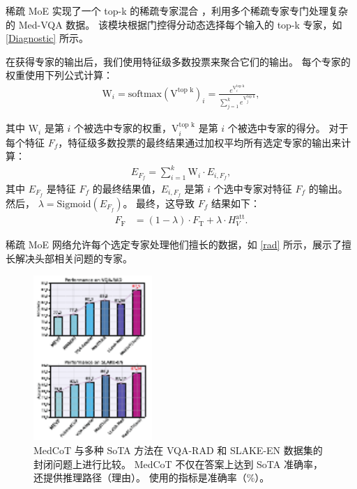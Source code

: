 \documentclass[11pt]{article}
\begin{document}
稀疏 MoE 实现了一个 top-k 的稀疏专家混合 \cite{fedus2022switch}，利用多个稀疏专家专门处理复杂的 Med-VQA 数据。
该模块根据门控得分动态选择每个输入的 top-k 专家，如 \autoref{Diagnostic} 所示。

在获得专家的输出后，我们使用特征级多数投票来聚合它们的输出。
每个专家的权重使用下列公式计算：
\begin{align}
    \text{W}_i = \text{softmax}(\text{V}^{\text{top k}})_i = \frac{e^{\text{V}^{\text{top k}}_i}}{\sum_{j=1}^{k} e^{\text{V}^{\text{top k}}_j}},
\end{align}

其中 \(\text{W}_i\) 是第 \(i\) 个被选中专家的权重，\(\text{V}^{\text{top k}}_i\) 是第 \(i\) 个被选中专家的得分。
对于每个特征 \( F_f \)，特征级多数投票的最终结果通过加权平均所有选定专家的输出来计算：
\begin{align}
    {E}_{F_f} = \sum_{i=1}^{k} \text{W}_i \cdot E_{i, F_f} ,
\end{align}
其中 \({E}_{F_f}\) 是特征 \( F_f \) 的最终结果值，\(E_{i, F_f}\) 是第 \(i\) 个选中专家对特征 \( F_f \) 的输出。然后，
\(\lambda = \text{Sigmoid}({E}_{F_f}) \)。
最终，这导致 \( F_f \) 结果如下：
\begin{align}
    F_{\text{F}} &= (1-\lambda) \cdot F_{\text{T}} + \lambda \cdot H_{V}^{\text{att}}.
\end{align}

稀疏 MoE 网络允许每个选定专家处理他们擅长的数据，如 \autoref{rad} 所示，展示了擅长解决头部相关问题的专家。

\begin{figure}[t]
\centering
\includegraphics[width=0.4\textwidth]{image/Performance5.pdf}
\caption{
MedCoT 与多种 SoTA 方法在 VQA-RAD 和 SLAKE-EN 数据集的封闭问题上进行比较。 MedCoT 不仅在答案上达到 SoTA 准确率，还提供推理路径（理由）。 使用的指标是准确率（\%）。
}
\label{performance}
\vspace{-1em}
\end{figure}
\end{document}
